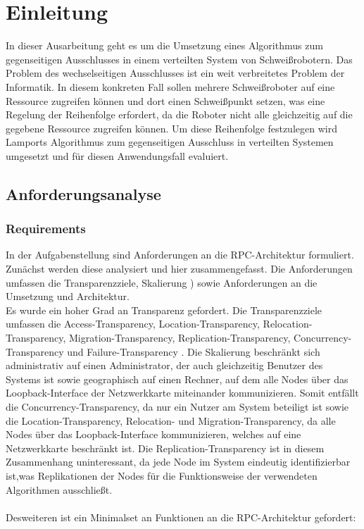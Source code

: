 %
\chapter{Einleitung}

In dieser Ausarbeitung geht es um die Umsetzung eines Algorithmus zum gegenseitigen Ausschlusses in einem
verteilten System von Schweißrobotern. Das Problem des wechselseitigen Ausschlusses 
ist ein weit verbreitetes Problem der Informatik. In diesem konkreten Fall sollen mehrere Schweißroboter
auf eine Ressource zugreifen können und dort einen Schweißpunkt setzen, was eine Regelung der Reihenfolge
erfordert, da die Roboter nicht alle gleichzeitig auf die gegebene Ressource zugreifen können. Um diese Reihenfolge
festzulegen wird Lamports Algorithmus \citep{lamport} zum gegenseitigen Ausschluss in verteilten Systemen umgesetzt
und für diesen Anwendungsfall evaluiert.

\section{Anforderungsanalyse}

\subsection{Requirements}

In der Aufgabenstellung sind Anforderungen an die RPC-Architektur formuliert.
Zunächst werden diese analysiert und hier zusammengefasst.
Die Anforderungen umfassen die Transparenzziele, Skalierung \cite{tanenbaumvansteen}) sowie Anforderungen
an die Umsetzung und Architektur.\\
Es wurde ein hoher Grad an Transparenz gefordert.
Die Transparenzziele umfassen die Access-Transparency, Location-Transparency, Relocation-Transparency,
Migration-Transparency, Replication-Transparency, Concurrency-Transparency und Failure-Transparency \citep{tanenbaumvansteen}.
Die Skalierung beschränkt sich administrativ auf einen Administrator, der auch gleichzeitig
Benutzer des Systems ist sowie geographisch auf einen Rechner, auf dem alle Nodes 
\citep{tanenbaumvansteen} über das Loopback-Interface der Netzwerkkarte miteinander kommunizieren.
Somit entfällt die Concurrency-Transparency, da nur ein Nutzer am System beteiligt ist sowie die
Location-Transparency, Relocation- und Migration-Transparency, da alle Nodes über das Loopback-Interface
kommunizieren, welches auf eine Netzwerkkarte beschränkt ist. Die Replication-Transparency ist in diesem Zusammenhang 
uninteressant, da jede Node im System eindeutig identifizierbar ist,was Replikationen der Nodes für die Funktionsweise 
der verwendeten Algorithmen ausschließt.\\\\
Desweiteren ist ein Minimalset an Funktionen an die RPC-Architektur gefordert:

